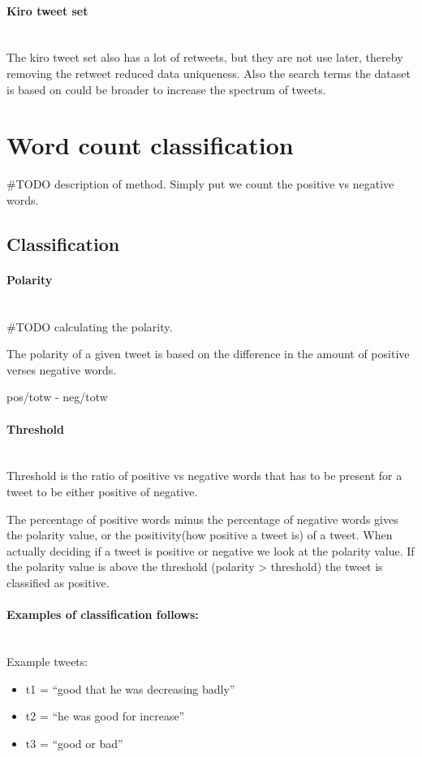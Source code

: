 \paragraph{Kiro tweet set}
\hspace{0pt}\\
The kiro tweet set also has a lot of retweets, but they are not use later,
thereby removing the retweet reduced data uniqueness. Also the search terms the
dataset is based on could be broader to increase the spectrum of tweets.  
%

\section{Word count classification}\label{sentiment:word_count_classification}
#TODO description of method. 
Simply put we count the positive vs negative words. 

\subsection{Classification}

\paragraph{Polarity} 
\hspace{0pt}\\ 
#TODO calculating the polarity.  

The polarity of a given tweet is based on the difference in the amount of
positive verses negative words.

pos/totw - neg/totw 

\paragraph{Threshold} 
\hspace{0pt}\\ 
Threshold is the ratio of positive vs negative words that has to be present for a
tweet to be either positive of negative.

The percentage of positive words minus the percentage of negative words gives
the polarity value, or the positivity(how positive a tweet is) of a tweet. 
When actually deciding if a tweet is positive or negative we look at the
polarity value. If the polarity value is above the threshold (polarity >
threshold) the tweet is classified as positive. 

\paragraph{Examples of classification follows:} 
\hspace{0pt}\\ 
Example tweets:
\begin{itemize}
    \item t1 = “good that he was decreasing badly”
    \item t2 = “he was good for increase” 
    \item t3 = “good or bad”
\end{itemize}

